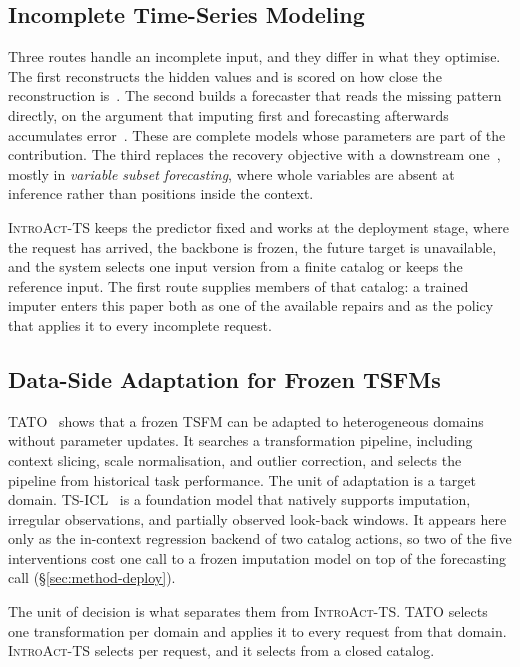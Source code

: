 \documentclass{article}
\newcommand{\introact}{\textsc{IntroAct-TS}}
\newcommand{\tsfm}{TSFM}
\begin{document}
\subsection{Incomplete Time-Series Modeling}
\label{sec:related-incomplete}
Three routes handle an incomplete input, and they differ in what they optimise. The first
reconstructs the hidden values and is scored on how close the reconstruction
is~\citep{cao2018brits,tashiro2021csdi,yoon2018gain,du2023saits,park2026t1}. The second builds
a forecaster that reads the missing pattern directly, on the argument that imputing first and
forecasting afterwards accumulates error~\citep{chen2024bitgraph,peng2025s4m,
jang2026channeltokenformer}. These are complete models whose parameters are part of the
contribution. The third replaces the recovery objective with a downstream
one~\citep{wang2024taskoriented,hao2025toivsf,hao2025gimcc,liang2025vida,xu2026srdi}, mostly in
\emph{variable subset forecasting}, where whole variables are absent at inference rather than
positions inside the context.

\introact{} keeps the predictor fixed and works at the deployment stage, where the request has
arrived, the backbone is frozen, the future target is unavailable, and the system selects one
input version from a finite catalog or keeps the reference input. The first route supplies
members of that catalog: a trained imputer enters this paper both as one of the available
repairs and as the policy that applies it to every incomplete request.

\subsection{Data-Side Adaptation for Frozen \tsfm{}s}
\label{sec:related-dataside}
TATO~\citep{qiu2026tato} shows that a frozen \tsfm{} can be adapted to heterogeneous domains
without parameter updates. It searches a transformation pipeline, including context slicing,
scale normalisation, and outlier correction, and selects the pipeline from historical task
performance. The unit of adaptation is a target domain. TS-ICL~\citep{tsicl2026} is a
foundation model that natively supports imputation, irregular observations, and partially
observed look-back windows. It appears here only as the in-context regression backend of two
catalog actions, so two of the five interventions cost one call to a frozen imputation model on top
of the forecasting call (\S\ref{sec:method-deploy}).

The unit of decision is what separates them from \introact{}. TATO selects one transformation
per domain and applies it to every request from that domain. \introact{} selects per request,
and it selects from a closed catalog.
\end{document}
